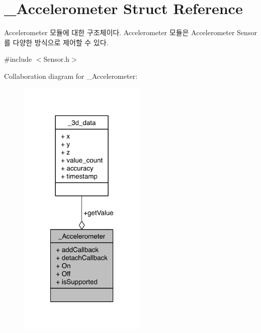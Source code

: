 \hypertarget{struct__Accelerometer}{\section{\-\_\-\-Accelerometer Struct Reference}
\label{struct__Accelerometer}
}


Accelerometer 모듈에 대한 구조체이다. Accelerometer 모듈은 Accelerometer Sensor를 다양한 방식으로 제어할 수 있다.  




{\ttfamily \#include $<$Sensor.\-h$>$}



Collaboration diagram for \-\_\-\-Accelerometer\-:\nopagebreak
\begin{figure}[H]
\begin{center}
\leavevmode
\includegraphics[width=173pt]{d5/d5a/struct__Accelerometer__coll__graph}
\end{center}
\end{figure}
